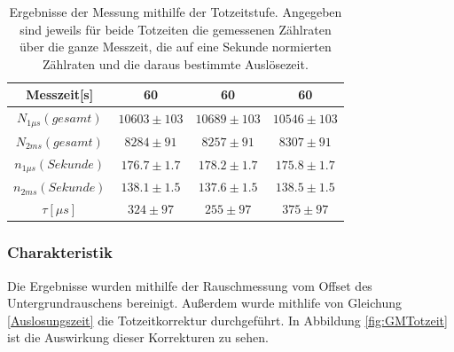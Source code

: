 \documentclass[12pt,a4paper]{article}
\begin{document}
\begin{table}[H]
\centering
\begin{tabular}{|c|c|c|c|}
\hline
Messzeit[s] & 60 &60&60\\
\hline 
$N_{1\mu s}(gesamt)$ & $10603 \pm 103$ & $10689\pm 103$ & $10546\pm 103$ \\
\hline 
$N_{2ms}(gesamt)$ & $8284\pm 91$ & $8257 \pm 91$ & $8307\pm 91$ \\
\hline 
$n_{1\mu s}(Sekunde)$ & $176.7 \pm 1.7$ & $178.2 \pm 1.7$ & $175.8\pm 1.7$ \\
\hline 
$n_{2ms}(Sekunde)$ & $138.1\pm 1.5$ & $137.6 \pm 1.5$ & $138.5\pm 1.5$ \\
\hline 
$\tau [\mu s]$ & $324\pm 97 $ & $255 \pm 97$ & $375\pm 97$ \\
\hline
\end{tabular}
\caption{Ergebnisse der Messung mithilfe der Totzeitstufe. Angegeben sind jeweils für beide Totzeiten die gemessenen Zählraten über die ganze Messzeit, die auf eine Sekunde normierten Zählraten und die daraus bestimmte Auslösezeit.}
\label{tab:Totzeitstufe}
\end{table}


\subsubsection{Charakteristik}
\label{GMchar}

Die Ergebnisse wurden mithilfe der Rauschmessung vom Offset des Untergrundrauschens bereinigt. 
Außerdem wurde mithlife von Gleichung \ref{Auslosungszeit} die Totzeitkorrektur durchgeführt. In Abbildung \ref{fig:GMTotzeit} ist die Auswirkung dieser Korrekturen zu sehen.
\end{document}

